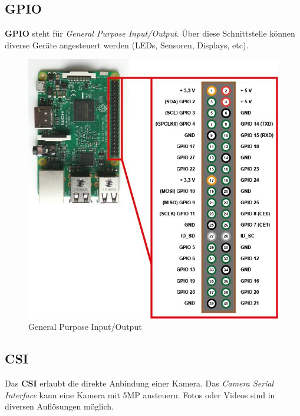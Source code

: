 \documentclass[12pt,a4paper]{article}
\begin{document}
\subsection{GPIO}

\textbf{GPIO} steht für \textit{General Purpose Input/Output}. Über diese Schnittstelle können diverse Geräte angesteuert werden (LEDs, Sensoren, Displays, etc).

\begin{figure}[H]
\centering
\includegraphics[scale=.5]{gpio}
\caption{General Purpose Input/Output}
\label{fig:gpio}
\end{figure}

\subsection{CSI}

Das \textbf{CSI} erlaubt die direkte Anbindung einer Kamera. Das \textit{Camera Serial Interface} kann eine Kamera mit 5MP ansteuern. Fotos oder Videos sind in diversen Auflösungen möglich.
\end{document}
